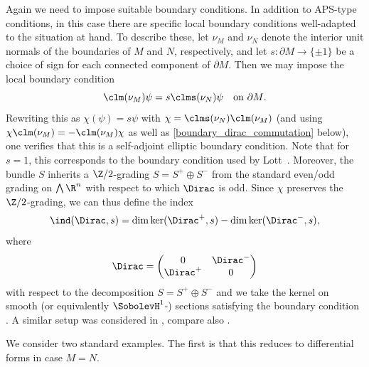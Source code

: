\documentclass[a4paper,11pt]{amsart}
\numberwithin{equation}{section}
\begin{document}
Again we need to impose suitable boundary conditions.
In addition to APS-type conditions, in this case there are specific local boundary conditions well-adapted to the situation at hand.
To describe these, let \(\nu_M\) and \(\nu_N\) denote the interior unit normals of the boundaries of \(M\) and \(N\), respectively, and let \(s \colon \partial M \to \{ \pm 1 \}\) be a choice of sign for each connected component of \(\partial M\).
Then we may impose the local boundary condition
\begin{equation}
\clm(\nu_M) \psi = s \clms(\nu_N) \psi \quad \text{on \(\partial M\).}   \label{eq:boundary_condition}
\end{equation}
Rewriting this as \(\chi(\psi) = s \psi \) with \(\chi = \clms(\nu_N) \clm(\nu_M)\) (and using \(\chi \clm(\nu_M) = -\clm(\nu_M) \chi\) as well as \cref{boundary_dirac_commutation} below), one verifies that this is a self-adjoint elliptic boundary condition.
Note that for \(s = 1\), this corresponds to the boundary condition used by Lott~\cite{Lott}.
Moreover, the bundle \(S\) inherits a \(\Z/2\)-grading \(S = S^+ \oplus S^-\) from the standard even/odd grading on \(\bigwedge \R^n\) with respect to which \(\Dirac\) is odd.
Since \(\chi\) preserves the \(\Z/2\)-grading, we can thus define the index 
\[
    \ind(\Dirac, s) = \dim \ker(\Dirac^+, s) - \dim \ker(\Dirac^-, s),   
\]
where 
\[\Dirac = \begin{pmatrix} 0 & \Dirac^- \\ \Dirac^+ & 0 \end{pmatrix}\]
with respect to the decomposition \(S = S^+ \oplus S^-\) and we take the kernel on smooth (or equivalently \(\SobolevH^1\)-) sections satisfying the boundary condition .
A similar setup was considered in \cite[\S 2--3]{scalar_mean_dirac}, compare also \cite[Appendix B]{BaerBrendleHankeWang}.

We consider two standard examples.
The first is that this reduces to differential forms in case \(M = N\).
\end{document}

